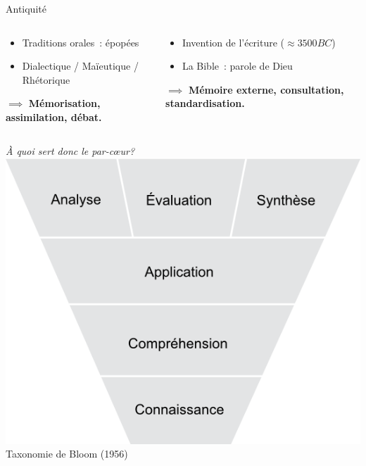 \begin{frame}{Antiquité}
\begin{columns}
\end{columns}
\begin{columns}
	\begin{column}{0.49\linewidth}
		\begin{itemize}
			\item Traditions orales~: épopées
			\item Dialectique / Maïeutique / Rhétorique
		\end{itemize}
		$\implies$ \textbf{Mémorisation, assimilation, débat.}
	\end{column}
	\begin{column}{0.49\linewidth}
		\begin{itemize}
			\item Invention de l'écriture ($\approx 3500BC$)
			\item La Bible~: parole de Dieu
		\end{itemize}
		$\implies$ \textbf{Mémoire externe, consultation, standardisation.}
	\end{column}
\end{columns}
\end{frame}
\begin{frame}

\centering
\Huge \emph{À quoi sert donc le par-c\oe{}ur?}
\vfill
\centering
\includegraphics[height=0.5\paperheight]{../resources/illustrations/bloom} \\
\vfill \hfill
\large Taxonomie de Bloom (1956) \hfill \hfill
\end{frame}

